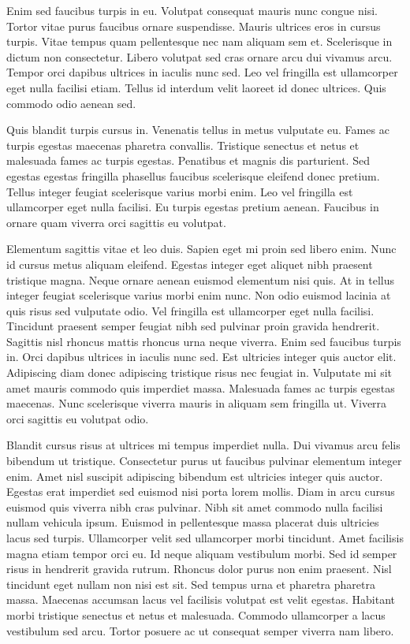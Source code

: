 \documentclass[11pt,a4paper]{article}
\begin{document}
Enim sed faucibus turpis in eu. Volutpat consequat mauris nunc congue nisi. Tortor vitae purus faucibus ornare suspendisse. Mauris ultrices eros in cursus turpis. Vitae tempus quam pellentesque nec nam aliquam sem et. Scelerisque in dictum non consectetur. Libero volutpat sed cras ornare arcu dui vivamus arcu. Tempor orci dapibus ultrices in iaculis nunc sed. Leo vel fringilla est ullamcorper eget nulla facilisi etiam. Tellus id interdum velit laoreet id donec ultrices. Quis commodo odio aenean sed.

Quis blandit turpis cursus in. Venenatis tellus in metus vulputate eu. Fames ac turpis egestas maecenas pharetra convallis. Tristique senectus et netus et malesuada fames ac turpis egestas. Penatibus et magnis dis parturient. Sed egestas egestas fringilla phasellus faucibus scelerisque eleifend donec pretium. Tellus integer feugiat scelerisque varius morbi enim. Leo vel fringilla est ullamcorper eget nulla facilisi. Eu turpis egestas pretium aenean. Faucibus in ornare quam viverra orci sagittis eu volutpat.

Elementum sagittis vitae et leo duis. Sapien eget mi proin sed libero enim. Nunc id cursus metus aliquam eleifend. Egestas integer eget aliquet nibh praesent tristique magna. Neque ornare aenean euismod elementum nisi quis. At in tellus integer feugiat scelerisque varius morbi enim nunc. Non odio euismod lacinia at quis risus sed vulputate odio. Vel fringilla est ullamcorper eget nulla facilisi. Tincidunt praesent semper feugiat nibh sed pulvinar proin gravida hendrerit. Sagittis nisl rhoncus mattis rhoncus urna neque viverra. Enim sed faucibus turpis in. Orci dapibus ultrices in iaculis nunc sed. Est ultricies integer quis auctor elit. Adipiscing diam donec adipiscing tristique risus nec feugiat in. Vulputate mi sit amet mauris commodo quis imperdiet massa. Malesuada fames ac turpis egestas maecenas. Nunc scelerisque viverra mauris in aliquam sem fringilla ut. Viverra orci sagittis eu volutpat odio.

Blandit cursus risus at ultrices mi tempus imperdiet nulla. Dui vivamus arcu felis bibendum ut tristique. Consectetur purus ut faucibus pulvinar elementum integer enim. Amet nisl suscipit adipiscing bibendum est ultricies integer quis auctor. Egestas erat imperdiet sed euismod nisi porta lorem mollis. Diam in arcu cursus euismod quis viverra nibh cras pulvinar. Nibh sit amet commodo nulla facilisi nullam vehicula ipsum. Euismod in pellentesque massa placerat duis ultricies lacus sed turpis. Ullamcorper velit sed ullamcorper morbi tincidunt. Amet facilisis magna etiam tempor orci eu. Id neque aliquam vestibulum morbi. Sed id semper risus in hendrerit gravida rutrum. Rhoncus dolor purus non enim praesent. Nisl tincidunt eget nullam non nisi est sit. Sed tempus urna et pharetra pharetra massa. Maecenas accumsan lacus vel facilisis volutpat est velit egestas. Habitant morbi tristique senectus et netus et malesuada. Commodo ullamcorper a lacus vestibulum sed arcu. Tortor posuere ac ut consequat semper viverra nam libero.
\end{document}
